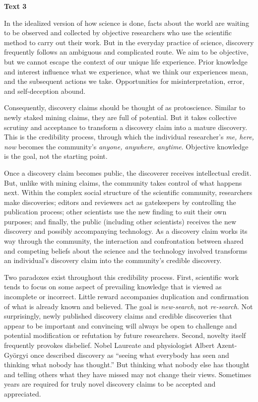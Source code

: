 
\begin{center}\textbf{Text 3}\end{center}

\qquad In the idealized version of how science is done, facts about the world are waiting to be observed and collected by objective researchers who use the scientific method to carry out their work. But in the everyday practice of science, discovery frequently follows an ambiguous and complicated route. We aim to be objective, but we cannot escape the context of our unique life experience. Prior knowledge and interest influence what we experience, what we think our experiences mean, and the subsequent actions we take. Opportunities for misinterpretation, error, and self-deception abound.

\qquad Consequently, discovery claims should be thought of as protoscience. Similar to newly staked mining claims, they are full of potential. But it takes collective scrutiny and acceptance to transform a discovery claim into a mature discovery. This is the credibility process, through which the individual researcher's \emph{me, here, now} becomes the community's \emph{anyone, anywhere, anytime}. Objective knowledge is the goal, not the starting point.

\qquad Once a discovery claim becomes public, the discoverer receives intellectual credit. But, unlike with mining claims, the community takes control of what happens next. Within the complex social structure of the scientific community, researchers make discoveries; editors and reviewers act as gatekeepers by controlling the publication process; other scientists use the new finding to suit their own purposes; and finally, the public (including other scientists) receives the new discovery and possibly accompanying technology. As a discovery claim works its way through the community, the interaction and confrontation between shared and competing beliefs about the science and the technology involved transforms an individual's discovery claim into the community's credible discovery.

\qquad Two paradoxes exist throughout this credibility process. First, scientific work tends to focus on some aspect of prevailing knowledge that is viewed as incomplete or incorrect. Little reward accompanies duplication and confirmation of what is already known and believed. The goal is \emph{new-search}, not \emph{re-search}. Not surprisingly, newly published discovery claims and credible discoveries that appear to be important and convincing will always be open to challenge and potential modification or refutation by future researchers. Second, novelty itself frequently provokes disbelief. Nobel Laureate and physiologist Albert Azent-Gy\"{o}rgyi once described discovery as ``seeing what everybody has seen and thinking what nobody has thought.'' But thinking what nobody else has thought and telling others what they have missed may not change their views. Sometimes years are required for truly novel discovery claims to be accepted and appreciated.

